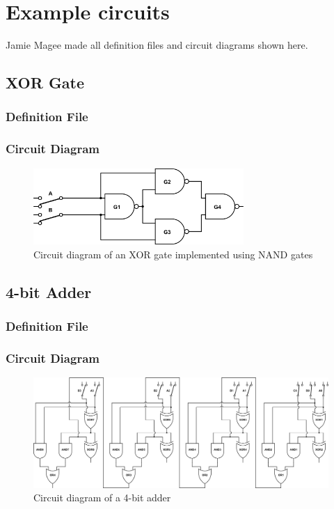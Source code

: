 \documentclass[a4paper,10pt]{article}
\begin{document}
\clearpage
\section{Example circuits}
\label{sec:examples}
Jamie Magee made all definition files and circuit diagrams shown here.

\subsection{XOR Gate}
\subsubsection{Definition File}

\subsubsection{Circuit Diagram}
\begin{figure}[h]
 \centering
 \includegraphics[width=8cm]{../../examples/xor.png}
 \caption{Circuit diagram of an XOR gate implemented using NAND gates}
 \label{fig:example-xor}
\end{figure}

\subsection{4-bit Adder}
\subsubsection{Definition File}

\subsubsection{Circuit Diagram}
\begin{figure}[h]
 \centering
 \includegraphics[width=16cm]{../../examples/4-bit-adder.png}
 \caption{Circuit diagram of a 4-bit adder}
 \label{fig:example-adder}
\end{figure}
\end{document}

